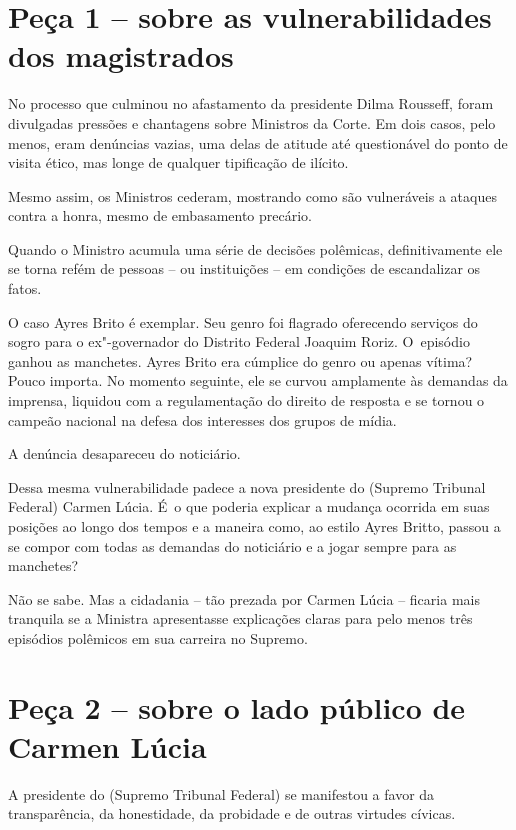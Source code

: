  

\section{Peça 1 -- sobre as vulnerabilidades dos magistrados}

No processo que culminou no afastamento da presidente Dilma Rousseff,
foram divulgadas pressões e chantagens sobre Ministros da Corte. Em dois
casos, pelo menos, eram denúncias vazias, uma delas de atitude até
questionável do ponto de visita ético, mas longe de qualquer tipificação
de ilícito.

Mesmo assim, os Ministros cederam, mostrando como são vulneráveis a
ataques contra a honra, mesmo de embasamento precário.

Quando o Ministro acumula uma série de decisões polêmicas,
definitivamente ele se torna refém de pessoas -- ou instituições -- em
condições de escandalizar os fatos.

O caso Ayres Brito é exemplar. Seu genro foi flagrado oferecendo
serviços do sogro para o ex"-governador do Distrito Federal Joaquim
Roriz. O~episódio ganhou as manchetes. Ayres Brito era cúmplice do genro
ou apenas vítima? Pouco importa. No momento seguinte, ele se curvou
amplamente às demandas da imprensa, liquidou com a regulamentação do
direito de resposta e se tornou o campeão nacional na defesa dos
interesses dos grupos de mídia.

A denúncia desapareceu do noticiário.

Dessa mesma vulnerabilidade padece a nova presidente do  (Supremo
Tribunal Federal) Carmen Lúcia. É~o que poderia explicar a mudança
ocorrida em suas posições ao longo dos tempos e a maneira como, ao
estilo Ayres Britto, passou a se compor com todas as demandas do
noticiário e a jogar sempre para as manchetes?

Não se sabe. Mas a cidadania -- tão prezada por Carmen Lúcia -- ficaria
mais tranquila se a Ministra apresentasse explicações claras para pelo
menos três episódios polêmicos em sua carreira no Supremo.

\section{Peça 2 -- sobre o lado público de Carmen Lúcia}

A presidente do  (Supremo Tribunal Federal) se manifestou a favor da
transparência, da honestidade, da probidade e de outras virtudes
cívicas.

